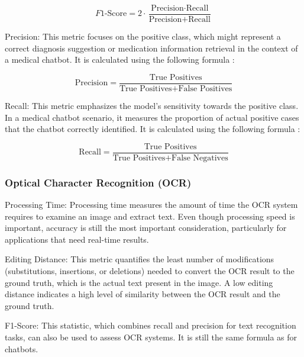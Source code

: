 \documentclass[conference]{IEEEtran}
\begin{document}
        \begin{equation}
            F1\text{-Score} = 2 \cdot \frac{\text{Precision} \cdot \text{Recall}}{\text{Precision} + \text{Recall}}
        \end{equation}
        
        Precision: This metric focuses on the positive class, which might represent a correct diagnosis suggestion or medication information retrieval in the context of a medical chatbot. It is calculated using the following formula \cite{goutte2005probabilistic}:
        
        \begin{equation}
        \text{Precision} = \frac{\text{True Positives}}{\text{True Positives} + \text{False Positives}}
        \end{equation}
        
        Recall: This metric emphasizes the model's sensitivity towards the positive class. In a medical chatbot scenario, it measures the proportion of actual positive cases that the chatbot correctly identified. It is calculated using the following formula \cite{goutte2005probabilistic}:
        
        \begin{equation}
        \text{Recall} = \frac{\text{True Positives}}{\text{True Positives} + \text{False Negatives}}
        \end{equation}

        \subsubsection{Optical Character Recognition (OCR)}
        
        Processing Time: Processing time measures the amount of time the OCR system requires to examine an image and extract text. Even though processing speed is important, accuracy is still the most important consideration, particularly for applications that need real-time results.
        
        Editing Distance: This metric quantifies the least number of modifications (substitutions, insertions, or deletions) needed to convert the OCR result to the ground truth, which is the actual text present in the image. A low editing distance indicates a high level of similarity between the OCR result and the ground truth.
        
        F1-Score: This statistic, which combines recall and precision for text recognition tasks, can also be used to assess OCR systems. It is still the same formula as for chatbots.
        
\end{document}
